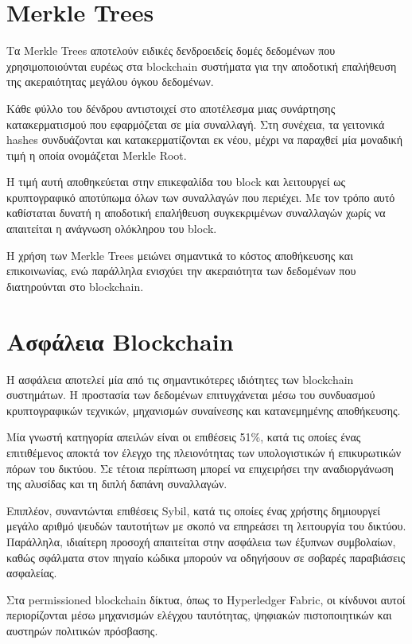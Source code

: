 \documentclass[12pt,a4paper]{report}
\begin{document}
\section{Merkle Trees}

Τα Merkle Trees αποτελούν ειδικές δενδροειδείς δομές δεδομένων που χρησιμοποιούνται ευρέως στα blockchain συστήματα για την αποδοτική επαλήθευση της ακεραιότητας μεγάλου όγκου δεδομένων.

Κάθε φύλλο του δένδρου αντιστοιχεί στο αποτέλεσμα μιας συνάρτησης κατακερματισμού που εφαρμόζεται σε μία συναλλαγή. Στη συνέχεια, τα γειτονικά hashes συνδυάζονται και κατακερματίζονται εκ νέου, μέχρι να παραχθεί μία μοναδική τιμή η οποία ονομάζεται Merkle Root.

Η τιμή αυτή αποθηκεύεται στην επικεφαλίδα του block και λειτουργεί ως κρυπτογραφικό αποτύπωμα όλων των συναλλαγών που περιέχει. Με τον τρόπο αυτό καθίσταται δυνατή η αποδοτική επαλήθευση συγκεκριμένων συναλλαγών χωρίς να απαιτείται η ανάγνωση ολόκληρου του block.

Η χρήση των Merkle Trees μειώνει σημαντικά το κόστος αποθήκευσης και επικοινωνίας, ενώ παράλληλα ενισχύει την ακεραιότητα των δεδομένων που διατηρούνται στο blockchain.

\section{Ασφάλεια Blockchain}

Η ασφάλεια αποτελεί μία από τις σημαντικότερες ιδιότητες των blockchain συστημάτων. Η προστασία των δεδομένων επιτυγχάνεται μέσω του συνδυασμού κρυπτογραφικών τεχνικών, μηχανισμών συναίνεσης και κατανεμημένης αποθήκευσης.

Μία γνωστή κατηγορία απειλών είναι οι επιθέσεις 51\%, κατά τις οποίες ένας επιτιθέμενος αποκτά τον έλεγχο της πλειονότητας των υπολογιστικών ή επικυρωτικών πόρων του δικτύου. Σε τέτοια περίπτωση μπορεί να επιχειρήσει την αναδιοργάνωση της αλυσίδας και τη διπλή δαπάνη συναλλαγών.

Επιπλέον, συναντώνται επιθέσεις Sybil, κατά τις οποίες ένας χρήστης δημιουργεί μεγάλο αριθμό ψευδών ταυτοτήτων με σκοπό να επηρεάσει τη λειτουργία του δικτύου. Παράλληλα, ιδιαίτερη προσοχή απαιτείται στην ασφάλεια των έξυπνων συμβολαίων, καθώς σφάλματα στον πηγαίο κώδικα μπορούν να οδηγήσουν σε σοβαρές παραβιάσεις ασφαλείας.

Στα permissioned blockchain δίκτυα, όπως το Hyperledger Fabric, οι κίνδυνοι αυτοί περιορίζονται μέσω μηχανισμών ελέγχου ταυτότητας, ψηφιακών πιστοποιητικών και αυστηρών πολιτικών πρόσβασης.
\end{document}
